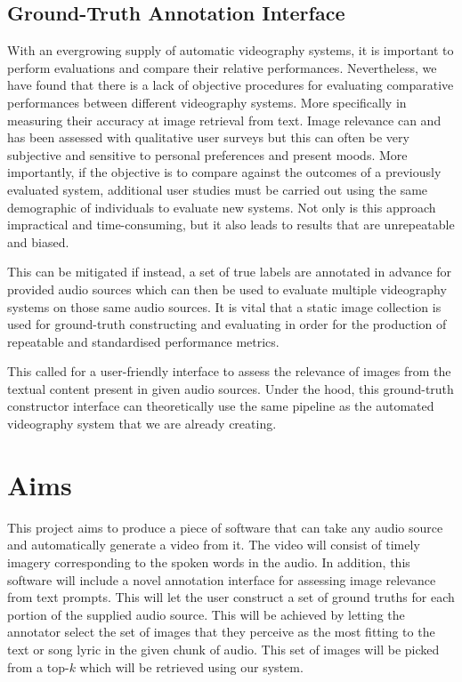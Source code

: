 \documentclass{l4proj}
\begin{document}
\subsection{Ground-Truth Annotation Interface}
With an evergrowing supply of automatic videography systems, it is important to perform evaluations and compare their relative performances. Nevertheless, we have found that there is a lack of objective procedures for evaluating comparative performances between different videography systems. More specifically in measuring their accuracy at image retrieval from text. Image relevance can and has been assessed with qualitative user surveys but this can often be very subjective and sensitive to personal preferences and present moods. More importantly, if the objective is to compare against the outcomes of a previously evaluated system, additional user studies must be carried out using the same demographic of individuals to evaluate new systems. Not only is this approach impractical and time-consuming, but it also leads to results that are unrepeatable and biased.

This can be mitigated if instead, a set of true labels are annotated in advance for provided audio sources which can then be used to evaluate multiple videography systems on those same audio sources. It is vital that a static image collection is used for ground-truth constructing and evaluating in order for the production of repeatable and standardised performance metrics.

This called for a user-friendly interface to assess the relevance of images from the textual content present in given audio sources. Under the hood, this ground-truth constructor interface can theoretically use the same pipeline as the automated videography system that we are already creating. 


\section{Aims}
This project aims to produce a piece of software that can take any audio source and automatically generate a video from it. The video will consist of timely imagery corresponding to the spoken words in the audio. In addition, this software will include a novel annotation interface for assessing image relevance from text prompts. This will let the user construct a set of ground truths for each portion of the supplied audio source. This will be achieved by letting the annotator select the set of images that they perceive as the most fitting to the text or song lyric in the given chunk of audio. This set of images will be picked from a top-$k$ which will be retrieved using our system.
\end{document}
